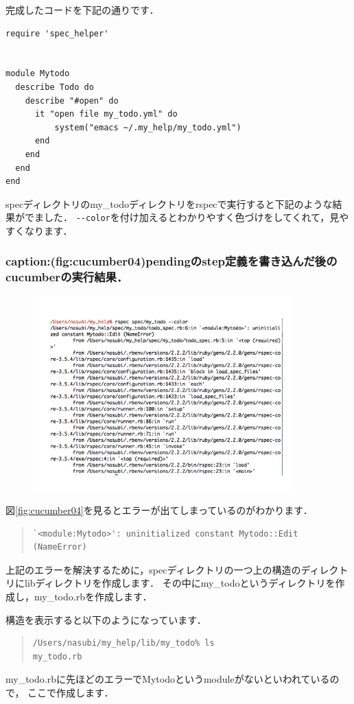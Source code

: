 完成したコードを下記の通りです．
\begin{lstlisting}[style=customRuby]
require 'spec_helper'


module Mytodo
  describe Todo do
    describe "#open" do
      it "open file my_todo.yml" do
          system("emacs ~/.my_help/my_todo.yml")
      end
    end
  end
end

\end{lstlisting}
specディレクトリのmy\_todoディレクトリをrspecで実行すると下記のような結果がでました．
\verb|--color|を付け加えるとわかりやすく色づけをしてくれて，見やすくなります．

\subsubsection{caption:(fig:cucumber04)pendingのstep定義を書き込んだ後のcucumberの実行結果．}
\begin{figure}[htbp]\begin{center}
\includegraphics[width=10cm,bb= 0 0 737 553]{../figs/./cucumber04.001.jpg}
\caption{}
\label{default}\end{center}\end{figure}
図\ref{fig:cucumber04}を見るとエラーが出てしまっているのがわかります．
\begin{quote}\begin{verbatim}
`<module:Mytodo>': uninitialized constant Mytodo::Edit (NameError)
\end{verbatim}\end{quote}
上記のエラーを解決するために，specディレクトリの一つ上の構造のディレクトリにlibディレクトリを作成します．
その中にmy\_todoというディレクトリを作成し，my\_todo.rbを作成します．

構造を表示すると以下のようになっています．
\begin{quote}\begin{verbatim}
/Users/nasubi/my_help/lib/my_todo% ls
my_todo.rb
\end{verbatim}\end{quote}
my\_todo.rbに先ほどのエラーでMytodoというmoduleがないといわれているので，
ここで作成します．

